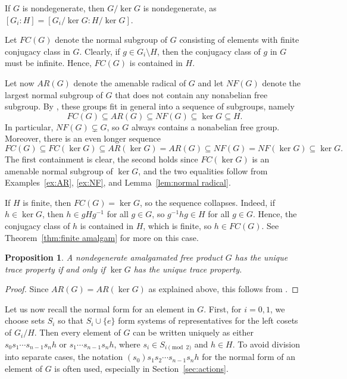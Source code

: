 \documentclass[a4paper]{amsart}
\theoremstyle{plain}
\newtheorem{proposition}[theorem]{Proposition}
\theoremstyle{definition}
\theoremstyle{remark}
\numberwithin{theorem}{section}
\begin{document}
If $G$ is nondegenerate, then $G/\ker G$ is nondegenerate, as $[G_i : H]=[G_i/\ker G : H/\ker G]$.

Let $FC(G)$ denote the normal subgroup of $G$ consisting of elements with finite conjugacy class in $G$.
Clearly, if $g \in G_i \setminus H$, then the conjugacy class of $g$ in $G$ must be infinite.
Hence, $FC(G)$ is contained in $H$.

Let now $AR(G)$ denote the amenable radical of $G$
and let $NF(G)$ denote the largest normal subgroup of $G$ that does not contain any nonabelian free subgroup.
By \cite[Proposition~7]{Cornulier}, these groups fit in general into a sequence of subgroups, namely
\begin{equation}\label{eq:chain}
FC(G) \subseteq AR(G) \subseteq NF(G) \subseteq \ker G \subseteq H.
\end{equation}
In particular, $NF(G)\subsetneq G$, so $G$ always contains a nonabelian free group.
Moreover, there is an even longer sequence
\[
FC(G) \subseteq FC(\operatorname{ker}G) \subseteq AR(\ker G) = AR(G) \subseteq NF(G) = NF(\ker G) \subseteq \ker G.
\]
The first containment is clear, the second holds since $FC(\ker G)$ is an amenable normal subgroup of $\ker G$,
and the two equalities follow from Examples~\ref{ex:AR}, \ref{ex:NF}, and Lemma~\ref{lem:normal radical}.

If $H$ is finite, then $FC(G)=\ker G$, so the sequence collapses.
Indeed, if $h\in\ker G$, then $h \in gHg^{-1}$ for all $g \in G$, so $g^{-1}hg \in H$ for all $g \in G$.
Hence, the conjugacy class of $h$ is contained in $H$, which is finite, so $h \in FC(G)$.
See Theorem~\ref{thm:finite amalgam} for more on this case.

\begin{proposition}\label{prop:amalgam ut}
A nondegenerate amalgamated free product $G$ has the unique trace property if and only if $\ker G$ has the unique trace property.
\end{proposition}

\begin{proof}
Since $AR(G)=AR(\ker G)$ as explained above, this follows from \cite[Theorem~1.3]{BKKO}.
\end{proof}

Let us now recall the normal form for an element in $G$.
First, for $i=0,1$, we choose sets $S_i$ so that $S_i\cup\{e\}$ form systems of representatives for the left cosets of $G_i/H$.
Then every element of $G$ can be written uniquely as either $s_0s_1 \cdots s_{n-1}s_nh$ or $s_1 \cdots s_{n-1}s_nh$,
where $s_i\in S_{i\pmod 2}$ and $h\in H$.
To avoid division into separate cases,
the notation $(s_0)s_1s_2\dotsm s_{n-1}s_nh$ for the normal form of an element of $G$ is often used,
especially in Section~\ref{sec:actions}.
\end{document}
